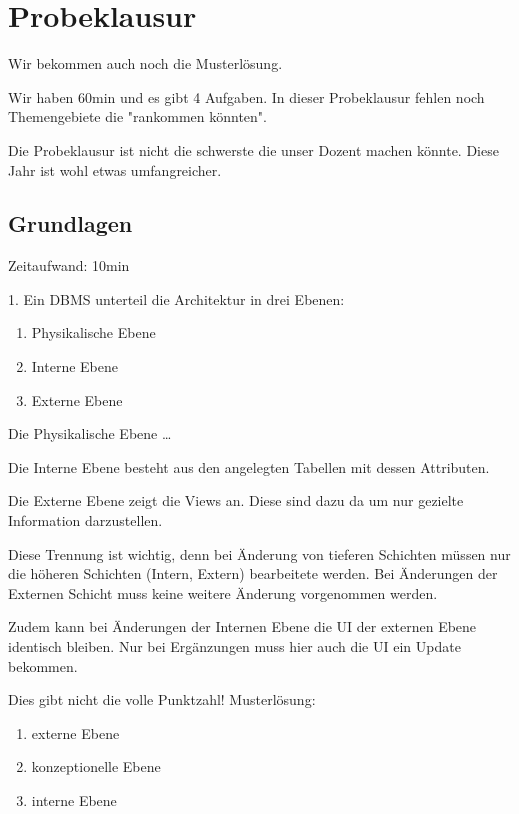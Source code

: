 \documentclass[a4paper]{article}
\begin{document}

\section{Probeklausur}

Wir bekommen auch noch die Musterlösung.

Wir haben 60min und es gibt 4 Aufgaben. In dieser Probeklausur fehlen noch Themengebiete die "rankommen könnten".

Die Probeklausur ist nicht die schwerste die unser Dozent machen könnte. Diese Jahr ist wohl etwas umfangreicher.

\subsection{Grundlagen}

Zeitaufwand: 10min

1. Ein DBMS unterteil die Architektur in drei Ebenen:

\begin{enumerate}
    \item Physikalische Ebene
    \item Interne Ebene
    \item Externe Ebene
\end{enumerate}

Die Physikalische Ebene \dots

Die Interne Ebene besteht aus den angelegten Tabellen mit dessen Attributen.

Die Externe Ebene zeigt die Views an. Diese sind dazu da um nur gezielte Information darzustellen. 

Diese Trennung ist wichtig, denn bei Änderung von tieferen Schichten müssen nur die höheren Schichten (Intern, Extern) bearbeitete werden. Bei Änderungen der Externen Schicht muss keine weitere Änderung vorgenommen werden.

Zudem kann bei Änderungen der Internen Ebene die UI der externen Ebene identisch bleiben. Nur bei Ergänzungen muss hier auch die UI ein Update bekommen.

Dies gibt nicht die volle Punktzahl! Musterlösung:

\begin{enumerate}
    \item externe Ebene
    \item konzeptionelle Ebene
    \item interne Ebene
\end{enumerate}
\end{document}
